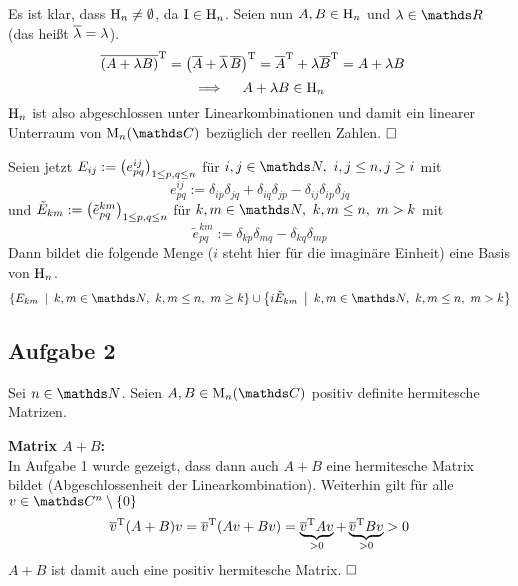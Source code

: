 		Es ist klar, dass $\mathrm{H}_n \neq \emptyset$, da $\mathrm{I}\in\mathrm{H}_n$.
		Seien nun $A,B\in\mathrm{H}_n$ und $\lambda\in\SR$ (das heißt $\overline{\lambda}=\lambda$).
		\begin{alignat*}{3}
			{ \overline{\left( A+\lambda B \right)} }^{\mathrm{T}} &= { \left( \overline{A} + \overline{\lambda}\, \overline{B} \right) }^{\mathrm{T}} = {\overline{A}}^{\mathrm{T}} + \lambda { \overline{B} }^{\mathrm{T}} = A + \lambda B
		\end{alignat*}
		\[ \implies \quad A+\lambda B \in \mathrm{H}_n \]
		$\mathrm{H}_n$ ist also abgeschlossen unter Linearkombinationen und damit ein linearer Unterraum von $\m{M}_n(\SC)$ bezüglich der reellen Zahlen. $\hfill \Box$

		Seien jetzt $E_{ij}:=\left( e^{ij}_{pq} \right)_{1\leq p,q\leq n}$ für $i,j\in\SN,\ i,j\leq n, j\geq i$ mit
		\[ e^{ij}_{pq} := \delta_{ip}\delta_{jq} + \delta_{iq}\delta_{jp} - \delta_{ij}\delta_{ip}\delta_{jq} \]
		und $\tilde{E}_{km}:=\left( \tilde{e}^{km}_{pq} \right)_{1\leq p,q\leq n}$ für $k,m\in\SN,\ k,m\leq n,\ m>k$ mit
		\[ \tilde{e}^{km}_{pq} := \delta_{kp}\delta_{mq} - \delta_{kq}\delta_{mp} \]
		Dann bildet die folgende Menge ($i$ steht hier für die imaginäre Einheit) eine Basis von $\mathrm{H}_n$.
		\[ \set{ E_{km} }{ k,m\in\SN,\ k,m\leq n,\ m\geq k } \cup \set{ i\tilde{E}_{km} }{ k,m\in\SN,\ k,m\leq n,\ m>k } \]


	\subsection*{Aufgabe 2} %
	\label{sub:aufgabe_2}
	
		Sei $n\in\SN$.
		Seien $A,B\in\m{M}_n(\SC)$ positiv definite hermitesche Matrizen.
		
		\textbf{Matrix $A+B$:}\\
		In Aufgabe 1 wurde gezeigt, dass dann auch $A+B$ eine hermitesche Matrix bildet (Abgeschlossenheit der Linearkombination).
		Weiterhin gilt für alle $v\in\SC^n\setminus \curlb{0}$
		\[ {\overline{v}}^{\mathrm{T}}(A+B)v = {\overline{v}}^{\mathrm{T}}(Av + Bv) = \underbrace{{\overline{v}}^{\mathrm{T}}Av}_{>0} + \underbrace{{\overline{v}}^{\mathrm{T}}Bv}_{>0} > 0 \]
		$A+B$ ist damit auch eine positiv hermitesche Matrix. $\hfill \Box$ \\

